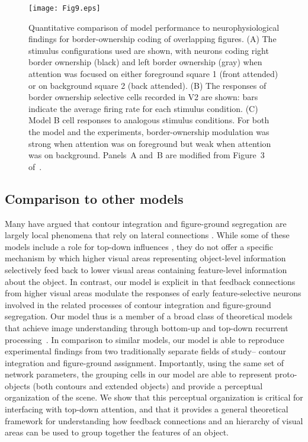 \begin{figure*}[t]
\begin{center}
\texttt{[image: Fig9.eps]}
\end{center}
\caption{Quantitative comparison of model performance to
  neurophysiological findings \citep{Qiu_etal07} for border-ownership coding of
  overlapping figures. (A) The stimulus configurations used are shown,
  with neurons coding right border ownership (black) and left border
  ownership (gray) when attention was focused on either foreground
  square 1 (front attended) or on background square 2 (back
  attended). (B) The responses of border ownership selective cells
  recorded in V2 are shown:  bars indicate the
  average firing rate 
  for each stimulus condition. (C) Model B cell responses to analogous
  stimulus conditions. For both the model and the experiments,
  border-ownership modulation was strong when attention was on
  foreground but weak when attention was on background. 
Panels~A and~B are modified from Figure~3 of~\cite{Qiu_etal07}.} 
\label{Fig:Overlap_Square_exp_model}
\end{figure*}

\subsection{Comparison to other models}

Many have argued that contour integration and figure-ground
segregation are largely local phenomena that rely on lateral
connections \citep{Grossberg94, Grossberg97, Li98, Zhaoping05,
  Piech_etal13}.  While some of these models include a role for top-down
influences \citep{Li98,Piech_etal13}, they do not offer a specific
mechanism by which higher visual areas representing object-level
information selectively feed back to lower visual areas containing
feature-level information about the object.  In contrast, our model is
explicit in that feedback connections from higher visual areas
modulate the responses of early feature-selective neurons involved in
the related processes of contour integration and figure-ground
segregation. Our model thus is a member of a broad class of theoretical models that achieve image
understanding through bottom-up and top-down recurrent
processing~\citep{Ullman84,Hochstein_Ahissar02,Roelfsema_06,Epshtein_etal08}.
In comparison to similar models, our model is able to reproduce
experimental findings from two traditionally separate fields of
study-- contour integration and figure-ground assignment. Importantly,
using the same set of network parameters, the grouping cells in our
model are able to represent proto-objects (both contours and extended
objects) and provide a perceptual organization of the scene. We 
show that this perceptual organization is critical for interfacing with top-down
attention, and that it provides a general theoretical framework for
understanding how feedback connections and an hierarchy of visual
areas can be used to group together the features of an object. 

